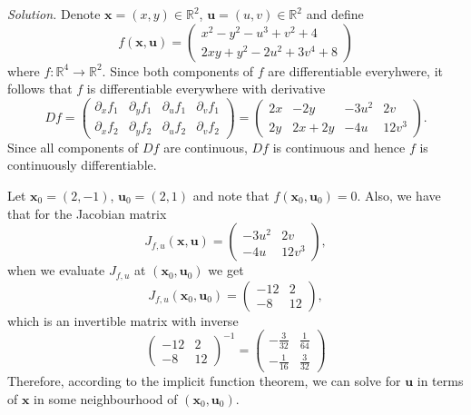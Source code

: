 \documentclass{article}
\newcommand{\0}{\mathbf{0}}
\newcommand{\bx}{\mathbf{x}}
\newcommand{\bu}{\mathbf{u}}
\newcommand{\R}{\mathbb{R}}
\begin{document}
\textit{Solution.}
Denote $\bx = (x, y) \in \R^2$, $\bu = (u, v) \in \R^2$ and define
%
\begin{equation*}
    f(\bx, \bu) =
        \begin{pmatrix}
            x^2 - y^2 - u^3 + v^2 + 4 \\
            2 x y + y^2 - 2 u^2 + 3 v^4 + 8
        \end{pmatrix}
\end{equation*}
%
where $f: \R^4 \to \R^2$. Since both components of $f$ are
differentiable everyhwere, it follows that $f$ is differentiable
everywhere with derivative
%
\begin{equation*}
    D f =
        \begin{pmatrix}
            \partial_x f_1 & \partial_y f_1 & \partial_u f_1 & \partial_v f_1 \\
            \partial_x f_2 & \partial_y f_2 & \partial_u f_2 & \partial_v f_2
        \end{pmatrix}
        =
        \begin{pmatrix}
            2x & -2y & -3u^2 & 2v \\
            2y & 2x + 2y & -4u & 12v^3
        \end{pmatrix}
        .
\end{equation*}
%
Since all components of $D f$ are continuous, $D f$ is continuous and
hence $f$ is continuously differentiable.

Let $\bx_0 = (2, -1)$, $\bu_0 = (2, 1)$ and note that $f(\bx_0, \bu_0) =
0$. Also, we have that for the Jacobian matrix
%
\begin{equation*}
    J_{f, u} (\bx, \bu) =
        \begin{pmatrix}
            -3u^2 & 2v \\
            -4u & 12v^3
        \end{pmatrix}
        ,
\end{equation*}
%
when we evaluate $J_{f, u}$ at $(\bx_0, \bu_0)$ we get
%
\begin{equation*}
    J_{f, u} (\bx_0, \bu_0) =
        \begin{pmatrix}
            -12 & 2 \\
            -8 & 12
        \end{pmatrix}
        ,
\end{equation*}
%
which is an invertible matrix with inverse
%
\begin{equation*}
    \begin{pmatrix}
        -12 & 2 \\
        -8 & 12
    \end{pmatrix}^{-1}
    =
    \begin{pmatrix}
        -\frac{3}{32} & \frac{1}{64} \\[4pt]
        -\frac{1}{16} & \frac{3}{32}
    \end{pmatrix}
\end{equation*}
%
Therefore, according to the implicit function theorem, we can solve for
$\bu$ in terms of $\bx$ in some neighbourhood of $(\bx_0, \bu_0)$.
\end{document}
